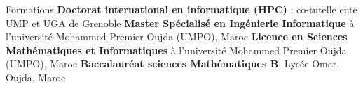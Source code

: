 
\begin{rubric}{Formations}
\entry*[]%
    \textbf{Doctorat international en informatique (HPC)} : co-tutelle ente UMP et UGA de Grenoble
    \hfill {}
\entry*[]%
    \textbf{Master Spécialisé en Ingénierie Informatique} à l'université Mohammed Premier Oujda (UMPO), Maroc
    \hfill {}
%
\entry*[]%
    \textbf{Licence en Sciences Mathématiques et Informatiques} à l'université Mohammed Premier Oujda (UMPO), Maroc
        \hfill {}
%
%
\entry*[]%
    \textbf{Baccalauréat sciences Mathématiques B}, Lycée Omar, Oujda, Maroc
        \hfill {}
\end{rubric}
